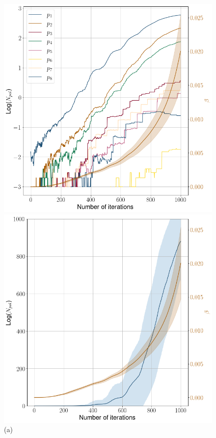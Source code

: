 \documentclass[11pt]{article}
\begin{document}
\begin{figure}[h!]
	\centering
	\begin{adjustbox}{width=20cm,center}
		\begin{minipage}[t]{0.31\paperwidth}
			\centering
			\includegraphics[width=\linewidth]{Figures/Count_beta_adaptative_temp_indiv}
			\caption*{(a)}
		\end{minipage}%
		\hfill
		\begin{minipage}[t]{0.31\paperwidth}
			\centering
			\includegraphics[width=\linewidth]{Figures/Count_good_pol_all}

\end{minipage}
\end{adjustbox}
\end{figure}
\end{document}
